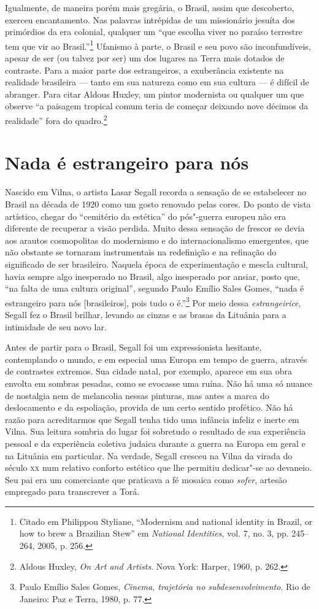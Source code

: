 Igualmente, de maneira porém mais gregária, o Brasil, assim que
descoberto, exerceu encantamento. Nas palavras intrépidas de um
missionário jesuíta dos primórdios da era colonial, qualquer um ``que
escolha viver no paraíso terrestre tem que vir ao Brasil.''\footnote{Citado
  em Philippou Styliane, ``Modernism and national identity in Brazil, or
  how to brew a Brazilian Stew'' em \textit{National Identities,} vol. 7,
  no. 3, pp. 245--264, 2005, p. 256.} Ufanismo à parte, o Brasil e seu
povo são inconfundíveis, apesar de ser (ou talvez por ser) um dos
lugares na Terra mais dotados de contraste. Para a maior parte dos
estrangeiros, a exuberância existente na realidade brasileira --- tanto em
sua natureza como em sua cultura --- é difícil de abranger. Para citar
Aldous Huxley, um pintor modernista ou qualquer um que observe ``a
paisagem tropical comum teria de começar deixando nove décimos da
realidade'' fora do quadro.\footnote{Aldous Huxley, \textit{On Art and
  Artists}. Nova York: Harper, 1960, p. 262.} 

\section*{Nada é estrangeiro para nós}

Nascido em Vilna, o artista
Lasar Segall recorda a sensação de se estabelecer no Brasil na década de
1920 como um gosto renovado pelas cores. Do ponto de vista artístico,
chegar do ``cemitério da estética'' do pós"-guerra europeu não era
diferente de recuperar a visão perdida. Muito dessa sensação de frescor
se devia aos arautos cosmopolitas do modernismo e do internacionalismo
emergentes, que não obstante se tornaram instrumentais na redefinição e
na refinação do significado de ser brasileiro. Naquela época de
experimentação e mescla cultural, havia sempre algo inesperado no
Brasil, algo inesperado por ansiar, posto que, ``na falta de uma cultura
original'', segundo Paulo Emílio Sales Gomes, ``nada é estrangeiro para
nós {[}brasileiros{]}, pois tudo o é.''\footnote{Paulo Emílio
Sales Gomes, \textit{Cinema, trajetória no subdesenvolvimento}. Rio de
Janeiro: Paz e Terra, 1980, p. 77.} Por meio dessa \textit{estrangeirice},
Segall fez o Brasil brilhar, levando as cinzas e as brasas da Lituânia
para a intimidade de seu novo lar.

Antes de partir para o Brasil, Segall foi um expressionista hesitante,
contemplando o mundo, e em especial uma Europa em tempo de guerra,
através de contrastes extremos. Sua cidade natal, por exemplo, aparece
em sua obra envolta em sombras pesadas, como se evocasse uma ruína. Não
há uma só nuance de nostalgia nem de melancolia nessas pinturas, mas
antes a marca do deslocamento e da espoliação, provida de um certo
sentido profético. Não há razão para acreditarmos que Segall tenha tido
uma infância infeliz e inerte em Vilna. Sua leitura sombria do lugar foi
sobretudo o resultado de sua experiência pessoal e da experiência
coletiva judaica durante a guerra na Europa em geral e na Lituânia em
particular. Na verdade, Segall cresceu na Vilna da virada do século \textsc{xx}
num relativo conforto estético que lhe permitiu dedicar"-se ao devaneio.
Seu pai era um comerciante que praticava a fé mosaica como \textit{sofer},
artesão empregado para transcrever a Torá. 

